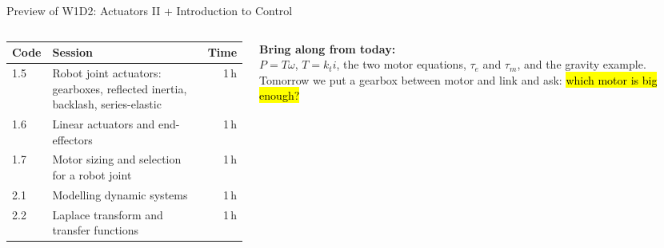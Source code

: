 \documentclass[aspectratio=169,10pt]{beamer}
\begin{document}
\begin{frame}{Preview of W1D2: Actuators II + Introduction to Control}
\begin{columns}[T]
\begin{column}{.55\textwidth}
\small
\renewcommand{\arraystretch}{1.15}
\begin{tabular}{@{}lp{5.3cm}r@{}}
\toprule
\textbf{Code} & \textbf{Session} & \textbf{Time}\\
\midrule
1.5 & Robot joint actuators: gearboxes, reflected inertia, backlash, series-elastic & 1\,h\\
1.6 & Linear actuators and end-effectors & 1\,h\\
1.7 & Motor sizing and selection for a robot joint & 1\,h\\
2.1 & Modelling dynamic systems & 1\,h\\
2.2 & Laplace transform and transfer functions & 1\,h\\
\bottomrule
\end{tabular}
\end{column}
\begin{column}{.42\textwidth}
\begin{notebox}
\small
\textbf{Bring along from today:}\\
$P=T\omega$, $T=k_ti$, the two motor equations, $\tau_e$ and $\tau_m$, and the gravity example. Tomorrow we put a gearbox between motor and link and ask: \hl{which motor is big enough?}
\end{notebox}
\end{column}
\end{columns}
\end{frame}
\end{document}
